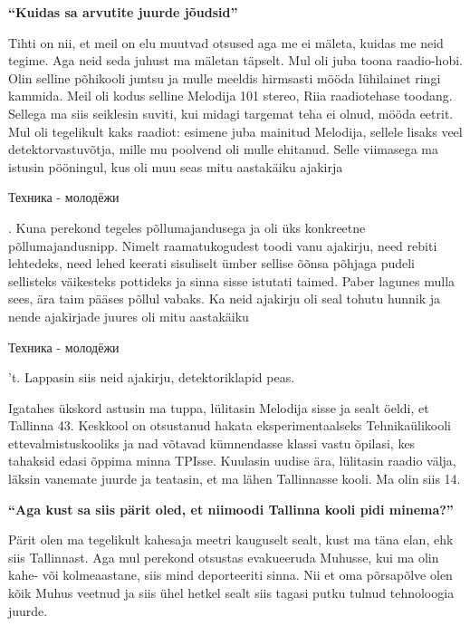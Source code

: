 
\textbf{\enquote{Kuidas sa arvutite juurde jõudsid}}

Tihti on nii, et meil on elu muutvad otsused aga me ei mäleta, kuidas me neid 
tegime. Aga neid seda juhust ma mäletan täpselt. Mul oli juba toona 
raadio-hobi. Olin selline põhikooli juntsu ja mulle meeldis hirmsasti mööda 
lühilainet ringi kammida. Meil oli kodus selline Melodija 101 stereo, Riia 
raadiotehase toodang. Sellega ma siis seiklesin suviti, kui midagi targemat 
teha ei olnud, mööda eetrit. Mul oli tegelikult kaks raadiot: esimene juba 
mainitud Melodija, sellele lisaks veel detektorvastuvõtja, mille mu poolvend 
oli mulle ehitanud. Selle viimasega ma istusin pööningul, kus oli muu seas mitu 
aastakäiku ajakirja \begin{russian}Техника - 
молодёжи\end{russian}. Kuna perekond tegeles põllumajandusega ja oli 
üks konkreetne põllumajandusnipp. Nimelt raamatukogudest toodi vanu ajakirju, 
need rebiti lehtedeks, need lehed keerati sisuliselt ümber sellise õõnsa 
põhjaga pudeli sellisteks väikesteks pottideks ja  sinna sisse istutati taimed. 
Paber lagunes mulla sees, ära taim pääses põllul vabaks. Ka neid ajakirju oli 
seal tohutu hunnik ja nende ajakirjade juures oli mitu aastakäiku 
\begin{russian}Техника - молодёжи\end{russian}'t. Lappasin siis neid ajakirju, 
detektoriklapid peas. 

Igatahes ükskord astusin ma tuppa, lülitasin Melodija sisse ja sealt öeldi, et 
Tallinna 43. Keskkool on otsustanud hakata 
eksperimentaalseks Tehnikaülikooli ettevalmistuskooliks ja 
nad võtavad kümnendasse klassi vastu õpilasi, kes tahaksid edasi õppima minna 
TPIsse. Kuulasin uudise ära, lülitasin raadio välja, läksin vanemate juurde ja 
teatasin, et ma lähen Tallinnasse kooli. Ma olin siis 14.


\textbf{\enquote{Aga kust sa siis pärit oled, et niimoodi Tallinna kooli pidi 
minema?}}


Pärit olen ma tegelikult kahesaja meetri kauguselt sealt, kust ma täna elan, 
ehk siis Tallinnast. Aga mul perekond otsustas evakueeruda 
Muhusse, kui ma olin kahe- või kolmeaastane, siis mind 
deporteeriti sinna. Nii et oma põrsapõlve olen kõik Muhus  veetnud ja siis ühel 
hetkel sealt siis tagasi putku tulnud tehnoloogia juurde. 

